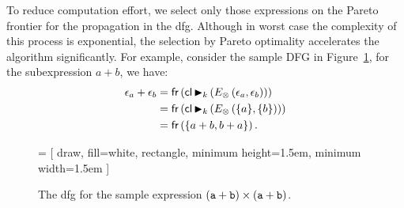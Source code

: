 To reduce computation effort, we select only those expressions on the Pareto
frontier for the propagation in the \gls{dfg}\@. Although in worst case the
complexity of this process is exponential, the selection by Pareto optimality
accelerates the algorithm significantly.  For example, consider the sample DFG
in Figure~\ref{so:fig:sample_tree}, for the subexpression $a + b$, we have:
\begin{equation}
    \begin{aligned}
        \epsilon_a + \epsilon_b
            &= \operatorname{\mathsf{fr}}\left(
                    \operatorname{\mathsf{cl}} \operatorname{\blacktriangleright}_k \left(
                        E_\otimes \left( \epsilon_a, \epsilon_b \right)
                    \right)
                \right) \\
            &= \operatorname{\mathsf{fr}}\left(
                    \operatorname{\mathsf{cl}} \operatorname{\blacktriangleright}_k \left(
                        E_\otimes \left( \{a\}, \{b\} \right)
                    \right)
                \right) \\
            &= \operatorname{\mathsf{fr}}\left(
                    \{ a + b, b + a \}
                \right).
    \end{aligned}
\end{equation}
\begin{figure}[ht]
    \centering
     = [
        draw,
        fill=white,
        rectangle,
        minimum height=1.5em,
        minimum width=1.5em
    ]
    \caption{%
        The \acrshort{dfg} for the sample expression $(\texttt{a} + \texttt{b}) \times
        (\texttt{a} + \texttt{b})$.
    }\label{so:fig:sample_tree}
\end{figure}

